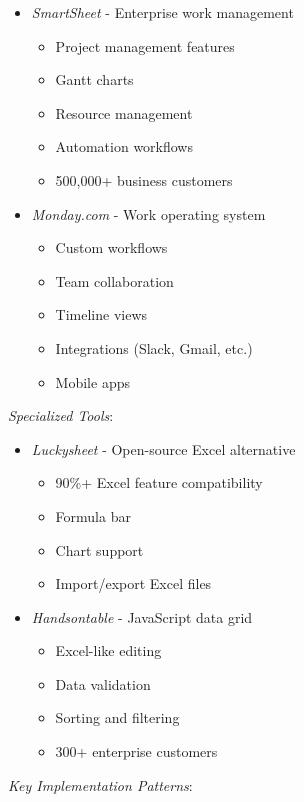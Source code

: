 \documentclass[11pt]{article}
\begin{document}
\begin{itemize}
\item \emph{SmartSheet} - Enterprise work management
\begin{itemize}
\item Project management features
\item Gantt charts
\item Resource management
\item Automation workflows
\item 500,000+ business customers
\end{itemize}

\item \emph{Monday.com} - Work operating system
\begin{itemize}
\item Custom workflows
\item Team collaboration
\item Timeline views
\item Integrations (Slack, Gmail, etc.)
\item Mobile apps
\end{itemize}
\end{itemize}

\emph{Specialized Tools}:

\begin{itemize}
\item \emph{Luckysheet} - Open-source Excel alternative
\begin{itemize}
\item 90\%+ Excel feature compatibility
\item Formula bar
\item Chart support
\item Import/export Excel files
\end{itemize}

\item \emph{Handsontable} - JavaScript data grid
\begin{itemize}
\item Excel-like editing
\item Data validation
\item Sorting and filtering
\item 300+ enterprise customers
\end{itemize}
\end{itemize}

\emph{Key Implementation Patterns}:
\end{document}
